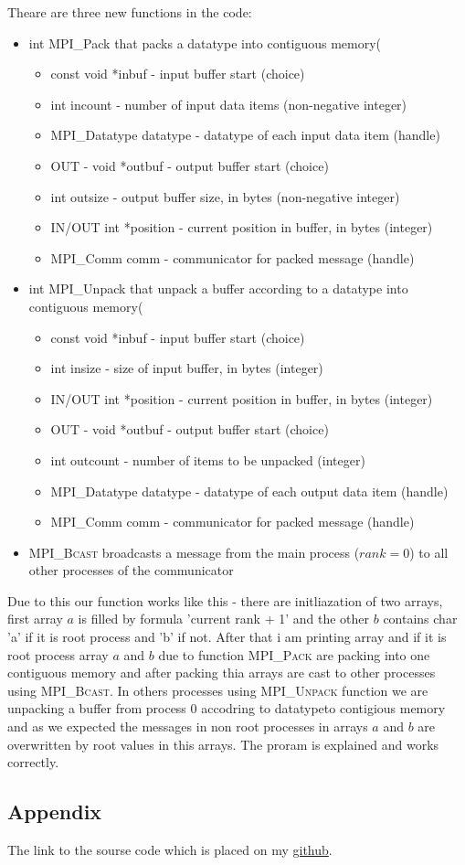 \documentclass[%
12pt, %
final, %
oneside, %
onecolumn, %
centertags]{article} %
\theoremstyle{plain}
\theoremstyle{definition}
\theoremstyle{remark}
\begin{document}
Theare are three new functions in the code:
\begin{itemize}
	\item int MPI\_Pack that packs a datatype into contiguous memory(
	\begin{itemize}
		\item const void *inbuf - input buffer start (choice)
		\item int incount - number of input data items (non-negative integer)
		\item MPI\_Datatype datatype - datatype of each input data item (handle)
		\item OUT - void *outbuf - output buffer start (choice)
		\item int outsize - output buffer size, in bytes (non-negative integer)
		\item IN/OUT int *position - current position in buffer, in bytes (integer)
		\item MPI\_Comm comm - communicator for packed message (handle)
	\end{itemize}
	\item int MPI\_Unpack that unpack a buffer according to a datatype into contiguous memory(
	\begin{itemize}
		\item const void *inbuf - input buffer start (choice)
		\item int insize - size of input buffer, in bytes (integer)
		\item IN/OUT int *position - current position in buffer, in bytes (integer)
		\item OUT - void *outbuf - output buffer start (choice)
		\item int outcount - number of items to be unpacked (integer)
		\item MPI\_Datatype datatype - datatype of each output data item (handle)
		\item MPI\_Comm comm - communicator for packed message (handle)
	\end{itemize}
	\item \textsc{MPI\_Bcast} broadcasts a message from the main process ($rank=0$) to all other processes of the communicator
\end{itemize}

Due to this our function works like this - there are initliazation of two arrays, first array $a$ is filled by formula 'current rank + 1' and the other $b$ contains char 'a' if it is root process and 'b' if not. After that i am printing array and if it is root process array $a$ and $b$ due to function \textsc{MPI\_Pack} are packing into one contiguous memory and after packing thia arrays are cast to other processes using \textsc{MPI\_Bcast}. In others processes using \textsc{MPI\_Unpack} function we are unpacking a buffer from process $0$ accodring to datatypeto contigious memory and as we expected the messages in non root processes in arrays $a$ and $b$ are overwritten by root values in this arrays. The proram is explained and works correctly.
\subsection{Appendix}
 
The link to the sourse code which is placed on my \href{https://github.com/aptmess/parallel_algorithms}{github}.
\end{document}
